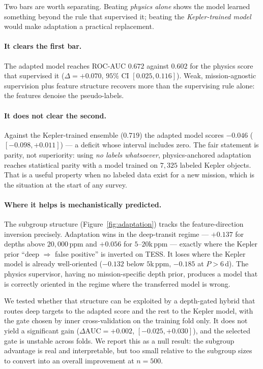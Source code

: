 \documentclass[11pt]{article}
\begin{document}
Two bars are worth separating. Beating \emph{physics alone} shows the model
learned something beyond the rule that supervised it; beating the
\emph{Kepler-trained model} would make adaptation a practical replacement.

\paragraph{It clears the first bar.} The adapted model reaches ROC-AUC $0.672$
against $0.602$ for the physics score that supervised it
($\Delta=+0.070$, $95\%$ CI $[0.025,0.116]$). Weak, mission-agnostic supervision
plus feature structure recovers more than the supervising rule alone: the
features denoise the pseudo-labels.

\paragraph{It does not clear the second.} Against the Kepler-trained ensemble
($0.719$) the adapted model scores $-0.046$ ($[-0.098,+0.011]$) --- a deficit
whose interval includes zero. The fair statement is parity, not superiority: using
\emph{no labels whatsoever}, physics-anchored adaptation reaches statistical
parity with a model trained on $7{,}325$ labeled Kepler objects. That is a
useful property when no labeled data exist for a new mission, which is the
situation at the start of any survey.

\paragraph{Where it helps is mechanistically predicted.} The subgroup structure
(Figure~\ref{fig:adaptation}) tracks the feature-direction inversion precisely.
Adaptation wins in the deep-transit regime --- $+0.137$ for depths above
$20{,}000$\,ppm and $+0.056$ for $5$--$20$k\,ppm --- exactly where the Kepler
prior ``deep $\Rightarrow$ false positive'' is inverted on TESS. It loses where
the Kepler model is already well-oriented ($-0.132$ below $5$k\,ppm, $-0.185$ at
$P>6$\,d). The physics supervisor, having no mission-specific depth prior,
produces a model that is correctly oriented in the regime where the transferred
model is wrong.

We tested whether that structure can be exploited by a depth-gated hybrid that
routes deep targets to the adapted score and the rest to the Kepler model, with
the gate chosen by inner cross-validation on the training fold only. It does not
yield a significant gain ($\Delta\text{AUC}=+0.002$, $[-0.025,+0.030]$), and the
selected gate is unstable across folds. We report this as a null result: the
subgroup advantage is real and interpretable, but too small relative to the
subgroup sizes to convert into an overall improvement at $n=500$.
\end{document}
